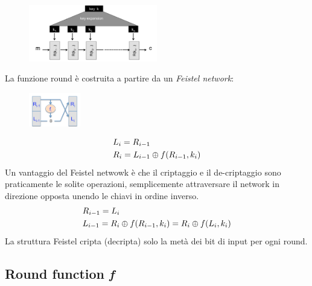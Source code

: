 \documentclass[a4paper,12pt]{article}
\begin{document}
\begin{figure}[H]
  \centering
  \includegraphics[width=0.5\textwidth]{img/key-schedule}
\end{figure}
La funzione round è costruita a partire da un \textit{Feistel network}:
\begin{figure}[H]
  \centering
  \includegraphics[width=0.2\textwidth]{img/feistel}
\end{figure}
\begin{align}
&L_i = R_{i-1} \notag\\
&R_i = L_{i-1} \oplus f(R_{i-1}, k_i) \notag
\end{align}
Un vantaggio del Feistel netwowk è che il criptaggio e il de-criptaggio sono praticamente le solite operazioni, semplicemente attraversare il network in direzione opposta unendo le chiavi in ordine inverso.
\begin{align}
&R_{i-1} = L_i \notag\\
&L_{i-1} = R_i \oplus f(R_{i-1}, k_i) = R_i \oplus f(L_i, k_i) \notag
\end{align}
La struttura Feistel cripta (decripta) solo la metà dei bit di input per ogni round.

\subsection{Round function \textit{f}}
\end{document}
